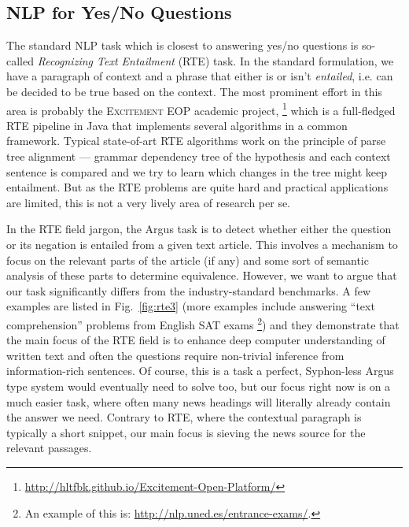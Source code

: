 \documentclass[11pt,a4paper]{article}
\begin{document}
\subsection{NLP for Yes/No Questions}

The standard NLP task which is closest to answering yes/no questions
is so-called \textit{Recognizing Text Entailment} (RTE) task.
In the standard formulation,
we have a paragraph of context and a phrase that either is or isn't
\textit{entailed}, i.e. can be decided to be true based on the context.
The most prominent effort in this area is probably the
\textsc{Excitement EOP} academic project,%
\footnote{\url{http://hltfbk.github.io/Excitement-Open-Platform/}}
which is a full-fledged
RTE pipeline in Java that implements several algorithms
in a common framework.
Typical state-of-art RTE algorithms work on the principle of parse tree
alignment --- grammar dependency tree of the hypothesis and each context
sentence is compared and we try to learn which changes in the tree might
keep entailment.
But as the RTE problems are quite hard and practical applications are limited,
this is not a very lively area of research per se.

In the RTE field jargon, the Argus task is to detect whether either the question or
its negation is entailed from a given text article.  This involves
a mechanism to focus on the relevant parts of the article (if any)
and some sort of semantic analysis of these parts to determine
equivalence.
However, we want to argue that our task significantly differs from
the industry-standard benchmarks.  A few examples are listed in Fig.~\ref{fig:rte3}
(more examples include answering ``text comprehension'' problems from
English SAT exams%
\footnote{An example of this is: \url{http://nlp.uned.es/entrance-exams/}.})
and they demonstrate that the main focus of the RTE field is to enhance
deep computer understanding of written text and often the questions
require non-trivial inference from information-rich sentences.
Of course, this is a task a perfect, Syphon-less Argus type system
would eventually need to solve too, but our focus right now is on a much
easier task, where often many news headings will literally already contain
the answer we need.  Contrary to RTE, where the contextual paragraph is
typically a short snippet, our main focus is sieving the news source for
the relevant passages.
\end{document}
